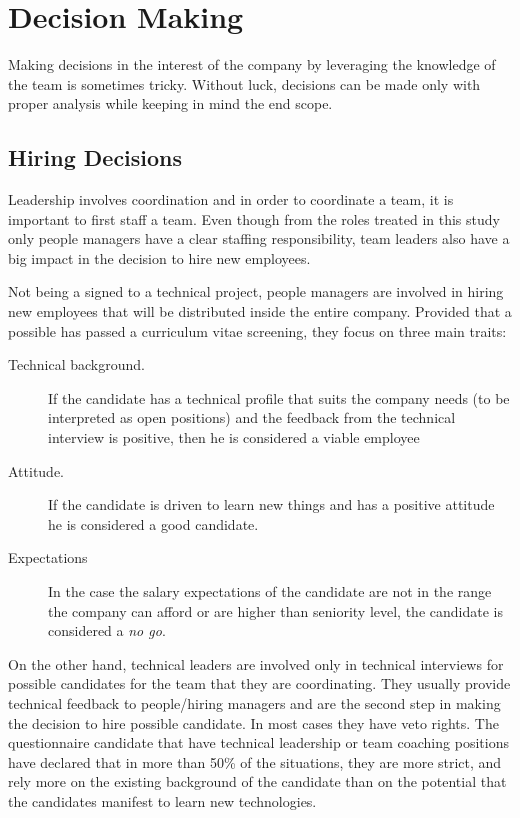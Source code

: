 \chapter{Decision Making}
\label{chapter:decision}
Making decisions in the interest of the company by leveraging the knowledge of the team is sometimes tricky. Without luck, decisions can be made only with proper analysis while keeping in mind the end scope.
\section{Hiring Decisions}
\label{sec:hiring}
Leadership involves coordination and in order to coordinate a team, it is important to first staff a team. Even though from the roles treated in this study only people managers have a clear staffing responsibility, team leaders also have a big impact in the decision to hire new employees. 

Not being a signed to a technical project, people managers are involved in hiring new employees that will be distributed inside the entire company. Provided that a possible has passed a curriculum vitae screening, they focus on three main traits:

\begin{description}
\item [Technical background.] If the candidate has a technical profile that suits the company needs (to be interpreted as open positions) and the feedback from the technical interview is positive, then he is considered a viable employee
\item [Attitude.] If the candidate is driven to learn new things and has a positive attitude he is considered a good candidate.
\item [Expectations] In the case the salary expectations of the candidate are not in the range the company can afford or are higher than seniority level, the candidate is considered a \textit{no go}.
\end{description}

On the other hand, technical leaders are involved only in technical interviews for possible candidates for the team that they are coordinating. They usually provide technical feedback to people/hiring managers and are the second step in making the decision to hire possible candidate. In most cases they have veto rights. The questionnaire candidate that have technical leadership or team coaching positions have declared that in more than 50\% of the situations, they are more strict, and rely more on the existing background of the candidate than on the potential that the candidates manifest to learn new technologies.

